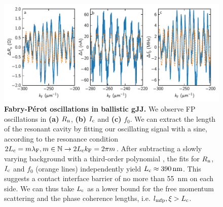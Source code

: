 \begin{figure}[]
	\centering
	\includegraphics[width=\linewidth]{chapter-gJJ/figs/si_fabryperot}
	\caption{{\bf Fabry-P\'erot oscillations in ballistic gJJ.}
		We observe FP oscillations in \textbf{(a)} $R_{\rm n}$, \textbf{(b)} $I_{\rm c}$ and \textbf{(c)} $f_0$.
		We can extract the length of the resonant cavity by fitting our oscillating signal with a sine, according to the resonance condition $2L_{\rm c} = m\lambda_{\rm F}, m\in\mathbb{N} \rightarrow 2L_{\rm c} k_{\rm F} = 2\pi m$.
		After subtracting a slowly varying background with a third-order polynomial \cite{calado_ballistic_2015a}, the fits for $R_{\rm n}$, $I_{\rm c}$ and $f_0$ (orange lines) independently yield $L_{\rm c}\approx \SI{390}{nm}$.
		This suggests a contact interface barrier of no more than \SI{55}{nm} on each side.
		We can thus take $L_{\rm c}$ as a lower bound for the free momentum scattering and the phase coherence lengths, i.e. $l_{\rm mfp},\xi>L_{\rm c}$.        }
	\label{fig:fabry-perot}
\end{figure}

